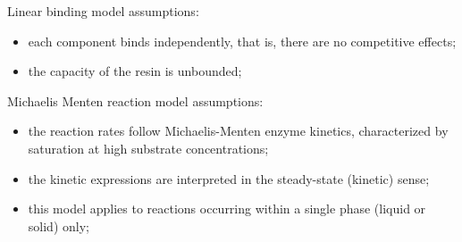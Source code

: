 \documentclass{article}
\begin{document}
Linear binding model assumptions:
\begin{itemize}
    \item each component binds independently, that is, there are no competitive effects;
    \item the capacity of the resin is unbounded;
\end{itemize}

Michaelis Menten reaction model assumptions:
\begin{itemize}
    \item the reaction rates follow Michaelis-Menten enzyme kinetics, characterized by saturation at high substrate concentrations;
    \item the kinetic expressions are interpreted in the steady-state (kinetic) sense;
    \item this model applies to reactions occurring within a single phase (liquid or solid) only;
\end{itemize}
\end{document}
